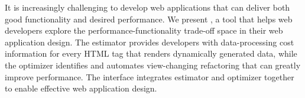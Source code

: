 \label{sec:con}
It is increasingly challenging to develop web applications that can deliver both good functionality and desired performance. We present \Tool, a tool that
helps web developers explore the performance-functionality trade-off space
in their web application design. The \Tool estimator provides developers 
with data-processing cost information for every HTML tag that renders
dynamically generated data, while the \Tool optimizer identifies and automates
view-changing refactoring that can greatly improve performance.
The \Tool interface integrates estimator and optimizer together to enable effective web application design. 
